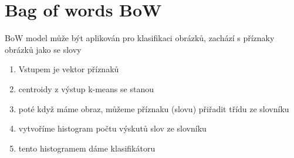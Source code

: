 \section{Bag of words BoW}
BoW model může být aplikován pro klasifikaci obrázků, zachází s příznaky obrázků jako se slovy
\begin{enumerate}
    \item Vstupem je vektor příznaků
    \item centroidy z výstup k-means se stanou 
    \item poté když máme obraz, můžeme příznaku (slovu) přiřadit třídu ze slovníku
    \item vytvoříme histogram počtu výskutů slov ze slovníku
    \item tento histogramem dáme klasifikátoru
\end{enumerate}
